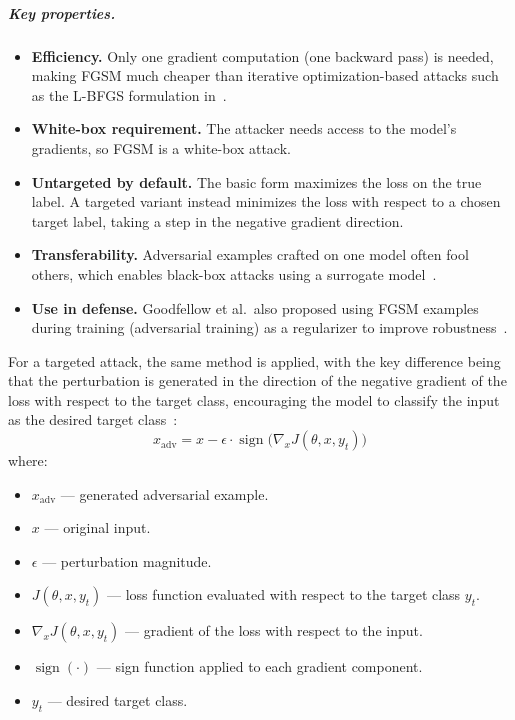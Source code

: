 \documentclass[12pt]{article}
\DeclareMathOperator{\sign}{sign}
\begin{document}
\subparagraph{Key properties.}
\begin{itemize}
  \item \textbf{Efficiency.} Only one gradient computation (one backward pass) is needed, making FGSM much cheaper than iterative optimization-based attacks such as the L-BFGS formulation in~\cite{szegedy2014}.
  \item \textbf{White-box requirement.} The attacker needs access to the model's gradients, so FGSM is a white-box attack.
  \item \textbf{Untargeted by default.} The basic form maximizes the loss on the true label. A targeted variant instead minimizes the loss with respect to a chosen target label, taking a step in the negative gradient direction.
  \item \textbf{Transferability.} Adversarial examples crafted on one model often fool others, which enables black-box attacks using a surrogate model~\cite{goodfellow2015,papernot2016transfer}.
  \item \textbf{Use in defense.} Goodfellow et al.\ also proposed using FGSM examples during training (adversarial training) as a regularizer to improve robustness~\cite{goodfellow2015}.
\end{itemize}

For a targeted attack, the same method is applied, with the key difference being that the perturbation is generated in the direction of the negative gradient of the loss with respect to the target class, encouraging the model to classify the input as the desired target class~\cite{li2020}:
\begin{equation}
  x_{\mathrm{adv}} = x - \epsilon \cdot \sign\!\big(\nabla_x J(\theta, x, y_t)\big)
\end{equation}
where:
\begin{itemize}
  \item $x_{\mathrm{adv}}$ --- generated adversarial example.
  \item $x$ --- original input.
  \item $\epsilon$ --- perturbation magnitude.
  \item $J(\theta, x, y_t)$ --- loss function evaluated with respect to the target class $y_t$.
  \item $\nabla_x J(\theta, x, y_t)$ --- gradient of the loss with respect to the input.
  \item $\sign(\cdot)$ --- sign function applied to each gradient component.
  \item $y_t$ --- desired target class.
\end{itemize}
\end{document}
